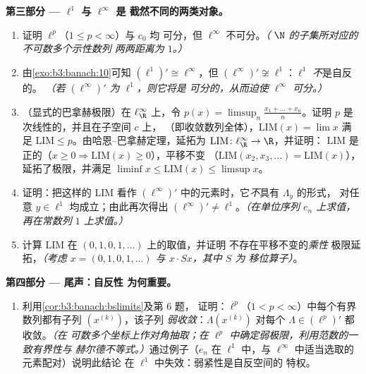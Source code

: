 \begin{problem}[{周末问题 --- $(\ell^p)' = \ell^q$，
自反性，以及 $\ell^\infty$ 的奇异性}]
\medskip
\noindent\textbf{第三部分 --- $\ell^1$ 与 $\ell^\infty$ 是
截然不同的两类对象。}
\begin{enumerate}[resume]
  \item 证明 $\ell^p$（$1 \leq p < \infty$）与 $c_0$ 均
        可分，但 $\ell^\infty$ 不可分。\emph{（
        $\N$ 的子集所对应的不可数多个示性数列
        两两距离为 $1$。）}
  \item 由\cref{exo:b3:banach:10}可知 $(\ell^1)'
        \cong \ell^\infty$，但 $(\ell^\infty)' \not\cong
        \ell^1$：$\ell^1$ \emph{不}是自反的。
        \emph{（若 $(\ell^\infty)'$ 为 $\ell^1$，则它将是
        可分的，从而迫使 $\ell^\infty$ 可分。）}
  \item （显式的巴拿赫极限）在 $\ell^\infty_\R$ 上，令
        $p(x) = \limsup_n \frac{x_1 + \dots + x_n}{n}$。证明
        $p$ 是次线性的，并且在子空间 $c$ 上，
        （即收敛数列全体），$\mathrm{LIM}(x) = \lim x$
        满足 $\mathrm{LIM} \leq p$。由哈恩–巴拿赫定理，延拓为
        $\mathrm{LIM} \colon \ell^\infty_\R \to \R$，并证明：
        $\mathrm{LIM}$ 是正的（$x \geq 0 \Rightarrow
        \mathrm{LIM}(x) \geq 0$），平移不变
        （$\mathrm{LIM}(x_2, x_3, \dots) = \mathrm{LIM}(x)$），
        延拓了极限，并满足 $\liminf x \leq
        \mathrm{LIM}(x)\leq \limsup x$。
  \item 证明：把这样的 $\mathrm{LIM}$ 看作
        $(\ell^\infty)'$ 中的元素时，它\emph{不}具有 $\Lambda_y$ 的形式，
        对任意 $y \in \ell^1$ 均成立；由此再次得出 $(\ell^\infty)'
        \neq \ell^1$。\emph{（在单位序列
        $e_n$ 上求值，再在常数列 $1$ 上求值。）}
  \item 计算 $\mathrm{LIM}$ 在 $(0,1,0,1,\dots)$ 上的取值，并证明
        不存在平移不变的\emph{乘性}
        极限延拓，\emph{（考虑 $x =
        (0,1,0,1,\dots)$ 与 $x\cdot Sx$，其中 $S$ 为
        移位算子）}。
\end{enumerate}

\medskip
\noindent\textbf{第四部分 --- 尾声：自反性
为何重要。}
\begin{enumerate}[resume]
  \item 利用\cref{cor:b3:banach:bslimits}及第 6 题，
        证明：$\ell^p$（$1 < p <
        \infty$）中每个有界数列都有子列 $(x^{(k)})$，该子列
        \emph{弱收敛}：$\Lambda(x^{(k)})$ 对每个
        $\Lambda \in (\ell^p)'$ 都收敛。\emph{（在
        可数多个坐标上作对角抽取；在
        $\ell^p$ 中确定弱极限，利用范数的一致有界性与
        赫尔德不等式。）}通过例子（$e_n$ 在 $\ell^1$ 中，与
        $\ell^\infty$ 中适当选取的元素配对）说明此结论
        在 $\ell^1$ 中失效：弱紧性是自反空间的
        特权。
\end{enumerate}


\end{problem}
